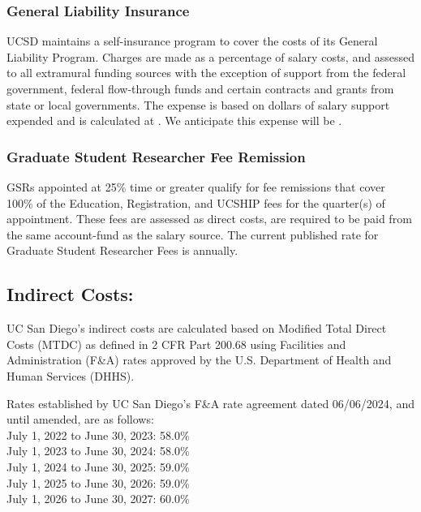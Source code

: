 \documentclass[../main.tex]{subfiles}
\begin{document}
\subsubsection{General Liability Insurance}
UCSD maintains a self-insurance program to cover the costs of its General Liability Program. 
Charges are made as a percentage of salary costs, and assessed to all extramural funding sources with the exception of support from the federal government, federal flow-through funds and certain contracts and grants from state or local governments. 
The expense is based on dollars of salary support expended and is calculated at . 
We anticipate this expense will be .

\subsubsection{Graduate Student Researcher Fee Remission}
GSRs appointed at 25\% time or greater qualify for fee remissions that cover 100\% of the Education, Registration, and UCSHIP fees for the quarter(s) of appointment. 
These fees are assessed as direct costs, are required to be paid from the same account-fund as the salary source. 
The current published rate for Graduate Student Researcher Fees is  annually.


\subsection{Indirect Costs:}

UC San Diego's indirect costs are calculated based on Modified Total Direct Costs (MTDC) as defined in 2 CFR Part 200.68 using Facilities and Administration (F\&A) rates approved by the U.S. Department of Health and Human Services (DHHS).

Rates established by UC San Diego's F\&A rate agreement dated 06/06/2024, and until amended, are as follows:\\
July 1, 2022 to June 30, 2023: 58.0\%\\
July 1, 2023 to June 30, 2024: 58.0\%\\
July 1, 2024 to June 30, 2025: 59.0\%\\
July 1, 2025 to June 30, 2026: 59.0\%\\
July 1, 2026 to June 30, 2027: 60.0\%
\end{document}
